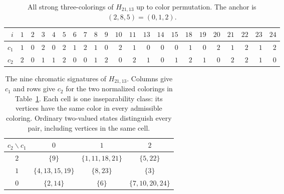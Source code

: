 \documentclass[aps,pra,reprint,superscriptaddress,longbibliography,nofootinbib,floatfix,10pt]{revtex4-2}
\theoremstyle{definition}
\begin{document}
\begin{table}[htbp]\centering\small\setlength{\tabcolsep}{3pt}
\caption{All strong three-colorings of $H_{21,13}$ up to color permutation. The anchor is $(2,8,5)=(0,1,2)$.}\label{tab:h21-colors}
\begin{tabular}{rrrrrrrrrrrrrrrrrrrrrr}
\toprule $i$ & $1$ & $2$ & $3$ & $4$ & $5$ & $6$ & $7$ & $8$ & $9$ & $10$ & $11$ & $13$ & $14$ & $15$ & $18$ & $19$ & $20$ & $21$ & $22$ & $23$ & $24$\\\midrule
$c_1$ & $1$ & $0$ & $2$ & $0$ & $2$ & $1$ & $2$ & $1$ & $0$ & $2$ & $1$ & $0$ & $0$ & $0$ & $1$ & $0$ & $2$ & $1$ & $2$ & $1$ & $2$\\
$c_2$ & $2$ & $0$ & $1$ & $1$ & $2$ & $0$ & $0$ & $1$ & $2$ & $0$ & $2$ & $1$ & $0$ & $1$ & $2$ & $1$ & $0$ & $2$ & $2$ & $1$ & $0$\\
\bottomrule\end{tabular}\end{table}

\begin{table}[htbp]\centering\small
\caption{The nine chromatic signatures of $H_{21,13}$.
Columns give $c_1$ and rows give $c_2$ for the two normalized colorings
in Table~\ref{tab:h21-colors}. Each cell is one inseparability class:
its vertices have the same color in every admissible coloring.
Ordinary two-valued states distinguish every pair, including vertices
in the same cell.}\label{tab:chromatic-signatures}
\renewcommand{\arraystretch}{1.3}\setlength{\tabcolsep}{10pt}
\begin{tabular}{cccc}\toprule
$c_2\backslash c_1$ & $0$ & $1$ & $2$\\\midrule
$2$ & $\{9\}$ & $\{1,11,18,21\}$ & $\{5,22\}$\\
$1$ & $\{4,13,15,19\}$ & $\{8,23\}$ & $\{3\}$\\
$0$ & $\{2,14\}$ & $\{6\}$ & $\{7,10,20,24\}$\\
\bottomrule\end{tabular}\end{table}
\end{document}
